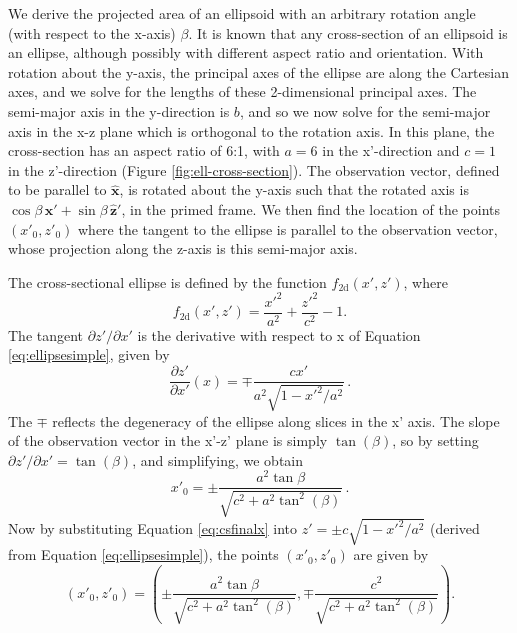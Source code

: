 \documentclass[twocolumn,doublespacing]{aastex631}
\begin{document}
We derive the projected area of an ellipsoid with an arbitrary rotation angle (with respect to the x-axis) $\beta$. It is known that any cross-section of an ellipsoid is an ellipse, although possibly with different aspect ratio and orientation. With rotation about the y-axis, the principal axes of the ellipse are along the Cartesian axes, and we solve for the lengths of these 2-dimensional principal axes. The semi-major axis in the y-direction is $b$, and so we now solve for the semi-major axis in the x-z plane which is orthogonal to the rotation axis. In this plane, the cross-section has an aspect ratio of 6:1, with $a=6$ in the x'-direction and $c=1$ in the z'-direction (Figure \ref{fig:ell-cross-section}). The observation vector, defined to be parallel to $\boldsymbol{\hat{x}}$, is rotated about the y-axis such that the rotated axis is $\cos\beta\,\boldsymbol{\hat{x}'}+\sin\beta\,\boldsymbol{\hat{z}'}$, in the primed frame. We then find the location of the points $(x'_0,z'_0)$ where the tangent to the ellipse is parallel to the observation vector, whose projection along the z-axis is this semi-major axis.

The cross-sectional ellipse is defined by the function $f_\text{2d}(x',z')$, where 
\begin{equation}\label{eq:ellipsesimple}
	f_\text{2d}(x',z')=\frac{x'^2}{a^2}+\frac{z'^2}{c^2}-1.
\end{equation}
The tangent $\partial z'/\partial x'$ is the derivative with respect to x of Equation \ref{eq:ellipsesimple}, given by
\begin{equation}
	\frac{\partial z'}{\partial x'}(x)=\mp \frac{c x'}{a^2\sqrt{1-x'^2/a^2}}\,.
\end{equation}
The $\mp$ reflects the degeneracy of the ellipse along slices in the x' axis. The slope of the observation vector in the x'-z' plane is simply $\tan(\beta)$, so by setting $\partial z'/\partial x'=\tan(\beta)$, and simplifying, we obtain 
\begin{equation}\label{eq:csfinalx}
    x'_0=\pm\frac{a^2\tan\beta}{\sqrt{c^2+a^2\tan^2(\beta)}}\,.
\end{equation}
Now by substituting Equation \ref{eq:csfinalx} into $z'=\pm c\sqrt{1-x'^2/a^2}$ (derived from Equation \ref{eq:ellipsesimple}), the points $(x'_0,z'_0)$ are given by
\begin{equation}\label{eq:x0z0}
    (x'_0,z'_0)=(\pm\frac{a^2\tan\beta}{\sqrt{c^2+a^2\tan^2(\beta)}},\mp \frac{c^2}{\sqrt{c^2+a^2\tan^2(\beta)}}).
\end{equation}
\end{document}
